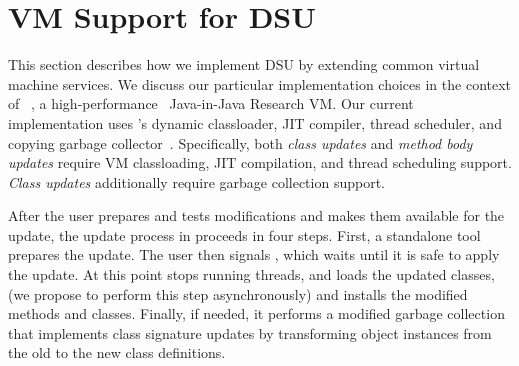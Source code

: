 \section{VM Support for DSU}
\label{sec:vm}






This section describes how we implement DSU by extending common
virtual machine services.  We
discuss our particular implementation choices in the context of
\JikesRVM{}~\cite{AAB+:99}, a high-performance~\cite{VMperf:webpage}
Java-in-Java Research VM\@. Our current \DSU{} implementation uses
\JikesRVM{}'s dynamic classloader, \acs{JIT} compiler, thread scheduler, and copying
garbage collector~\cite{BCM:04}.  Specifically, both \emph{class updates} and
\emph{method body updates} require VM
classloading, \acs{JIT} compilation, and thread scheduling support.
\emph{Class updates} additionally require garbage collection support.

After the user prepares and tests modifications and makes them available
for the update, the update process in \DSU{} proceeds in four steps.
First, a standalone tool prepares the update.  %
The user then signals \DSU{}, which waits until it is safe to apply the
update.  At this point \DSU{} stops running threads, and loads the
updated classes, (we propose to perform this step asynchronously)
and installs the modified methods and classes.  Finally, if
needed, it performs a modified garbage collection that implements class
signature updates by transforming object instances from the old to the new
class definitions.

